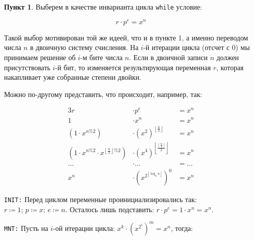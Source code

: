 \documentclass[11pt,a4paper]{scrarticle}
\theoremstyle{definition}
\newtheorem{subtask}{Пункт}
\begin{document}
\begin{subtask}
	Выберем в качестве инварианта цикла \texttt{while} условие:

	$$
		r \cdot p^{e} = x^{n}
	$$

	Такой выбор мотивирован той же идеей, что и в пункте 1, а именно переводом числа $n$ в двоичную систему счисления. На $i$-й итерации цикла (отсчет с $0$) мы принимаем решение об $i$-м бите числа $n$. Если в двоичной записи $n$ должен присутствовать $i$-й бит, то изменяется результирующая переменная $r$, которая накапливает уже собранные степени двойки.

	Можно по-другому представить, что происходит, например, так:

	\begin{alignat*}{3}
		r                                                                          & \cdot p^{e}                                                                                          & = x^{n} \\
		1                                                                          & \cdot x^{n}                                                                                          & = x^{n} \\
		(1 \cdot x^{n \% 2})                                                       & \cdot \left(x^{2}\right)^{\left\lfloor \frac{n}{2} \right\rfloor}                                    & = x^{n} \\
		(1 \cdot x^{n \% 2} \cdot x^{\left\lfloor \frac{n}{2} \right\rfloor \% 2}) & \cdot \left(x^{4}\right)^{\left\lfloor\frac{\left\lfloor \frac{n}{2} \right\rfloor}{2}\right\rfloor} & = x^{n} \\
		\dots                                                                      & \cdot \dots                                                                                          & = \dots \\
		x^{n}                                                                      & \cdot \left(x^{2^{\left\lfloor \log_2 n \right\rfloor}}\right)^{0}                                   & = x^{n}
	\end{alignat*}

	\texttt{INIT:} Перед циклом переменные проинициализировались так: $r \coloneq 1 ;\, p \coloneq x ;\, e \coloneq n$. Осталось лишь подставить: $r \cdot p^{e} = 1 \cdot x^{n} = x^{n}$.

	\texttt{MNT:} Пусть на $i$-ой итерации цикла: $x^{k} \cdot \left(x^{2^{i}}\right)^{m} = x^{n}$, тогда:


\end{subtask}
\end{document}
